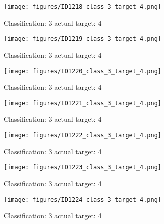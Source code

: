 \begin{figure}[h!]
\begin{center}
\texttt{[image: figures/ID1218\_class\_3\_target\_4.png]}
\end{center}
\caption{ Classification: 3 actual target: 4}
\label{fig:ID1218_class_3_target_4}
\end{figure}
\begin{figure}[h!]
\begin{center}
\texttt{[image: figures/ID1219\_class\_3\_target\_4.png]}
\end{center}
\caption{ Classification: 3 actual target: 4}
\label{fig:ID1219_class_3_target_4}
\end{figure}
\begin{figure}[h!]
\begin{center}
\texttt{[image: figures/ID1220\_class\_3\_target\_4.png]}
\end{center}
\caption{ Classification: 3 actual target: 4}
\label{fig:ID1220_class_3_target_4}
\end{figure}
\begin{figure}[h!]
\begin{center}
\texttt{[image: figures/ID1221\_class\_3\_target\_4.png]}
\end{center}
\caption{ Classification: 3 actual target: 4}
\label{fig:ID1221_class_3_target_4}
\end{figure}
\begin{figure}[h!]
\begin{center}
\texttt{[image: figures/ID1222\_class\_3\_target\_4.png]}
\end{center}
\caption{ Classification: 3 actual target: 4}
\label{fig:ID1222_class_3_target_4}
\end{figure}
\begin{figure}[h!]
\begin{center}
\texttt{[image: figures/ID1223\_class\_3\_target\_4.png]}
\end{center}
\caption{ Classification: 3 actual target: 4}
\label{fig:ID1223_class_3_target_4}
\end{figure}
\begin{figure}[h!]
\begin{center}
\texttt{[image: figures/ID1224\_class\_3\_target\_4.png]}
\end{center}
\caption{ Classification: 3 actual target: 4}
\label{fig:ID1224_class_3_target_4}
\end{figure}
